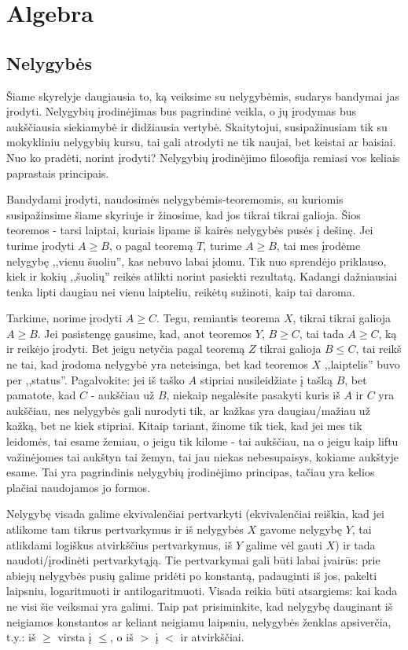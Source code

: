 \chapter{Algebra}
\thispagestyle{empty}

\section{Nelygybės}

Šiame skyrelyje daugiausia to, ką veiksime su nelygybėmis, sudarys bandymai
jas įrodyti. Nelygybių įrodinėjimas bus pagrindinė veikla, o jų įrodymas
bus aukščiausia siekiamybė ir didžiausia vertybė. Skaitytojui,
susipažinusiam tik su mokykliniu nelygybių kursu, tai gali atrodyti ne tik
naujai, bet keistai ar baisiai. Nuo ko pradėti, norint įrodyti? Nelygybių
įrodinėjimo filosofija remiasi vos keliais paprastais principais.

Bandydami įrodyti, naudosimės nelygybėmis-teoremomis, su kuriomis
susipažinsime šiame skyriuje ir žinosime, kad jos tikrai tikrai galioja.
Šios teoremos - tarsi laiptai, kuriais lipame iš kairės nelygybės pusės į
dešinę. Jei turime įrodyti $A\geq B$, o pagal teoremą $T$, turime
$A\geq B$, tai mes įrodėme nelygybę ,,vienu šuoliu'', kas nebuvo labai
įdomu. Tik nuo sprendėjo priklauso, kiek ir kokių ,,šuolių'' reikės atlikti
norint pasiekti rezultatą. Kadangi dažniausiai tenka lipti daugiau nei
vienu laipteliu, reikėtų sužinoti, kaip tai daroma.

Tarkime, norime įrodyti $A\geq C$. Tegu, remiantis teorema $X$,
tikrai tikrai galioja $A\geq B$. Jei pasistengę gausime, kad, anot
teoremos $Y$, $B\geq C$, tai tada $A\geq C$, ką ir reikėjo įrodyti. Bet
jeigu netyčia pagal teoremą $Z$ tikrai galioja $B\leq C$, tai reikš
ne tai, kad įrodoma nelygybė yra neteisinga, bet kad teoremos $X$
,,laiptelis'' buvo per ,,status''. Pagalvokite: jei iš taško $A$ stipriai
nusileidžiate į tašką $B$, bet pamatote, kad $C$ - aukščiau už $B$,
niekaip negalėsite pasakyti kuris iš $A$ ir $C$ yra aukščiau, nes nelygybės
gali nurodyti tik, ar kažkas yra daugiau/mažiau už kažką, bet ne kiek
stipriai. Kitaip tariant, žinome tik tiek, kad jei mes tik leidomės, tai
esame žemiau, o jeigu tik kilome - tai aukščiau, na o jeigu kaip liftu
važinėjomes tai aukštyn tai žemyn, tai jau niekas nebesupaisys, kokiame
aukštyje esame. Tai yra pagrindinis nelygybių įrodinėjimo principas, tačiau
yra kelios plačiai naudojamos jo formos.

Nelygybę visada galime ekvivalenčiai pertvarkyti (ekvivalenčiai reiškia,
kad jei atlikome tam tikrus pertvarkymus ir iš nelygybės $X$ gavome
nelygybę $Y$, tai atlikdami logiškus atvirkščius pertvarkymus, iš $Y$
galime vėl gauti $X$) ir tada naudoti/įrodinėti pertvarkytąją. Tie
pertvarkymai gali būti labai įvairūs: prie abiejų nelygybės pusių galime
pridėti po konstantą, padauginti iš jos, pakelti laipsniu, logaritmuoti ir
antilogaritmuoti. Visada reikia būti atsargiems: kai kada ne visi šie
veiksmai yra galimi. Taip pat prisiminkite, kad nelygybę dauginant iš
neigiamos konstantos ar keliant neigiamu laipsniu, nelygybės ženklas
apsiverčia, t.y.: iš $\geq$ virsta į $\leq$, o iš $>$ į $<$ ir atvirkščiai.

